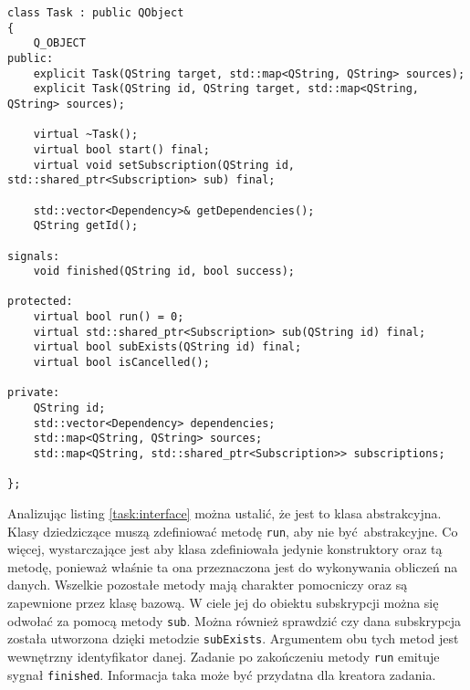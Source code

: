 \begin{minipage}{\textwidth}
	\begin{lstlisting}[label=task:interface, caption={Interfejs klasy \lstinline$Task$},alsoletter={()[].=}]
class Task : public QObject
{
	Q_OBJECT
public:
	explicit Task(QString target, std::map<QString, QString> sources);
	explicit Task(QString id, QString target, std::map<QString, QString> sources);

	virtual ~Task();
	virtual bool start() final;
	virtual void setSubscription(QString id, std::shared_ptr<Subscription> sub) final;

	std::vector<Dependency>& getDependencies();
	QString getId();

signals:
	void finished(QString id, bool success);

protected:
	virtual bool run() = 0;
	virtual std::shared_ptr<Subscription> sub(QString id) final;
	virtual bool subExists(QString id) final;
	virtual bool isCancelled();

private:
	QString id;
	std::vector<Dependency> dependencies;
	std::map<QString, QString> sources;
	std::map<QString, std::shared_ptr<Subscription>> subscriptions;

};
	\end{lstlisting}
\end{minipage}

Analizując listing \ref{task:interface} można ustalić, że jest to klasa abstrakcyjna. Klasy dziedziczące muszą zdefiniować metodę \lstinline$run$, aby nie być abstrakcyjne. Co więcej, wystarczające jest aby klasa zdefiniowała jedynie konstruktory oraz tą metodę, ponieważ właśnie ta ona przeznaczona jest do wykonywania obliczeń na danych. Wszelkie pozostałe metody mają charakter pomocniczy oraz są zapewnione przez klasę bazową. W ciele jej do obiektu subskrypcji można się odwołać za pomocą metody \lstinline$sub$. Można również sprawdzić czy dana subskrypcja została utworzona dzięki metodzie \lstinline$subExists$. Argumentem obu tych metod jest wewnętrzny identyfikator danej. Zadanie po zakończeniu metody \lstinline$run$ emituje sygnał \lstinline$finished$. Informacja taka może być przydatna dla kreatora zadania.

